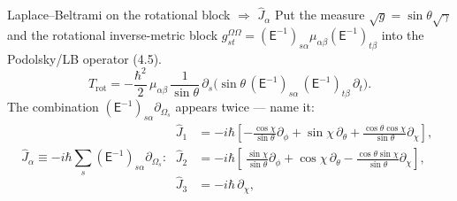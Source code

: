 \documentclass[aspectratio=169,10pt]{beamer}
\newcommand{\stagenum}{0}
\newcommand{\setstage}[1]{\renewcommand{\stagenum}{#1}}
\begin{document}
\begin{frame}{Laplace--Beltrami on the rotational block $\Rightarrow$ $\hat J_\alpha$}
\setstage{3}
Put the measure $\sqrt g=\sin\theta\sqrt\gamma$ and the rotational inverse-metric block $g^{\Omega\Omega}_{st}=(\mathsf E^{-1})_{s\alpha}\mu_{\alpha\beta}(\mathsf E^{-1})_{t\beta}$ into the Podolsky/LB operator (4.5). %
\begin{equation*}
\hat T_{\mathrm{rot}}=-\frac{\hbar^2}{2}\,\mu_{\alpha\beta}\,\frac{1}{\sin\theta}\,\partial_s\!\bigl(\sin\theta\,(\mathsf E^{-1})_{s\alpha}\,(\mathsf E^{-1})_{t\beta}\,\partial_t\bigr).
\end{equation*}
The combination $(\mathsf E^{-1})_{s\alpha}\partial_{\Omega_s}$ appears twice --- \alert{name it}:
\begin{equation*}
\boxed{\;\hat J_\alpha\equiv-i\hbar\!\sum_s(\mathsf E^{-1})_{s\alpha}\partial_{\Omega_s}:\ 
\begin{aligned}
\hat J_1&=-i\hbar[-\tfrac{\cos\chi}{\sin\theta}\partial_\phi+\sin\chi\,\partial_\theta+\tfrac{\cos\theta\cos\chi}{\sin\theta}\partial_\chi],\\
\hat J_2&=-i\hbar[\ \tfrac{\sin\chi}{\sin\theta}\partial_\phi+\cos\chi\,\partial_\theta-\tfrac{\cos\theta\sin\chi}{\sin\theta}\partial_\chi],\\
\hat J_3&=-i\hbar\,\partial_\chi ,
\end{aligned}\;}\tag{4.24}
\end{equation*}
\end{frame}
\end{document}
